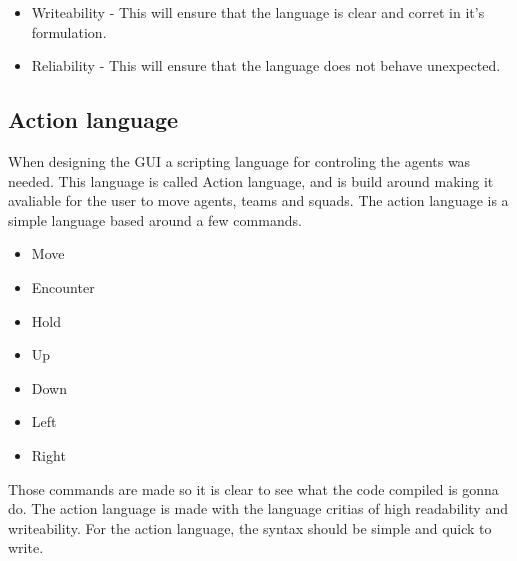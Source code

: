 \begin{itemize}
	\item Writeability - This will ensure that the language is clear and corret in it's formulation.
	\item Reliability - This will ensure that the language does not behave unexpected.
\end{itemize}

\subsection{Action language}
When designing the GUI a scripting language for controling the agents was needed. This language is called Action language, and is build around making it avaliable for the user to move agents, teams and squads.
The action language is a simple language based around a few commands.

\begin{itemize}
	\item Move
	\item Encounter
	\item Hold
	\item Up
	\item Down
	\item Left
	\item Right
\end{itemize}

Those commands are made so it is clear to see what the code compiled is gonna do. The action language is made with the language critias of high readability and writeability. For the action language, the syntax should be simple and quick to write.
